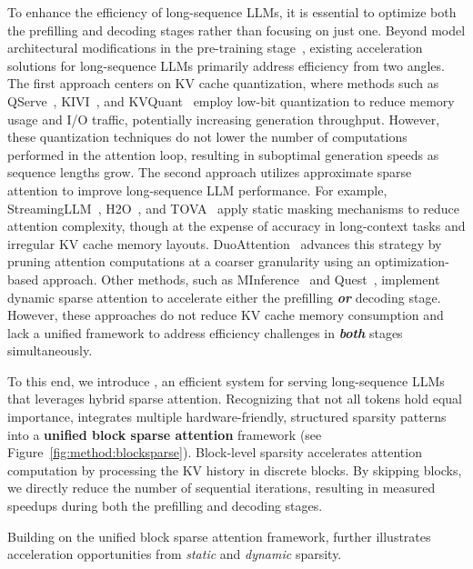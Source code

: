 To enhance the efficiency of long-sequence LLMs, it is essential to optimize both the prefilling and decoding stages rather than focusing on just one. Beyond model architectural modifications in the pre-training stage~\cite{ainslie2023gqa, brandon2024reducing}, existing acceleration solutions for long-sequence LLMs primarily address efficiency from two angles. The first approach centers on KV cache quantization, where methods such as QServe~\cite{lin2024qserve}, KIVI~\cite{liu2024kivi}, and KVQuant~\cite{hooper2024kvquant} employ low-bit quantization to reduce memory usage and I/O traffic, potentially increasing generation throughput. However, these quantization techniques do not lower the number of computations performed in the attention loop, resulting in suboptimal generation speeds as sequence lengths grow. The second approach utilizes approximate sparse attention to improve long-sequence LLM performance. For example, StreamingLLM~\cite{xiao2023efficient}, H2O~\cite{zhang2024h2o}, and TOVA~\cite{oren2024transformers} apply static masking mechanisms to reduce attention complexity, though at the expense of accuracy in long-context tasks and irregular KV cache memory layouts. DuoAttention~\cite{xiao2024duoattention} advances this strategy by pruning attention computations at a coarser granularity using an optimization-based approach. Other methods, such as MInference~\cite{jiang2024minference} and Quest~\cite{tang2024quest}, implement dynamic sparse attention to accelerate either the prefilling \textbf{\textit{or}} decoding stage. However, these approaches do not reduce KV cache memory consumption and lack a unified framework to address efficiency challenges in \textbf{\textit{both}} stages simultaneously.

To this end, we introduce \textbf{\system}, an efficient system for serving long-sequence LLMs that leverages hybrid sparse attention. Recognizing that not all tokens hold equal importance, \system integrates multiple hardware-friendly, structured sparsity patterns into a \textbf{unified block sparse attention} framework (see Figure~\ref{fig:method:blocksparse}). Block-level sparsity accelerates attention computation by processing the KV history in discrete blocks. By skipping blocks, we directly reduce the number of sequential iterations, resulting in measured speedups during both the prefilling and decoding stages.

Building on the unified block sparse attention framework, \system further illustrates acceleration opportunities from \textit{static} and \textit{dynamic} sparsity. 

